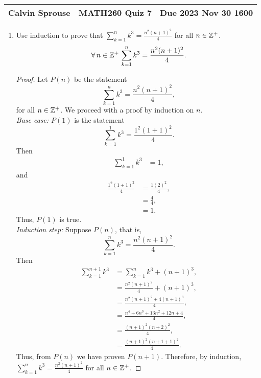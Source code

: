 \documentclass[a4paper, 12pt]{../../config/homework}
\begin{document}
\noindent
\begin{tabularx}{\textwidth}{>{\centering\arraybackslash}X>{\centering\arraybackslash}X>{\centering\arraybackslash}X}
Calvin Sprouse & MATH260 Quiz 7 & Due 2023 Nov 30 1600\\\hline
\end{tabularx}

\begin{enumerate}
\item Use induction to prove that $\sum_{k=1}^{n}{k^3} = \frac{n^2 (n+1)^2}{4}$ for all $n\in\mathbb{Z}^+$.
\[\forall\, n \in \mathbb{Z}^+ \, \sum_{k=1}^{n}{k^3} = \frac{n^2 (n+1)^2}{4}.\]
\begin{proof}
Let $P(n)$ be the statement
\[\sum_{k=1}^{n}{k^3} = \frac{n^2(n+1)^2}{4},\]
for all $n\in\mathbb{Z}^+$.
We proceed with a proof by induction on $n$.
\\\textit{Base case:} $P(1)$ is the statement
\[\sum_{k=1}^{1}k^3 = \frac{1^2(1+1)^2}{4}.\]
Then
\begin{align*}
\sum_{k=1}^{1}k^3 &= 1,
\end{align*}
and
\begin{align*}
\frac{1^2 (1+1)^2}{4} &= \frac{1 (2)^2}{4},
\\&= \frac{4}{4},
\\&= 1.
\end{align*}
Thus, $P(1)$ is true.
\\\textit{Induction step:} Suppose $P(n)$, that is,
\[\sum_{k=1}^{n}k^3 = \frac{n^2(n+1)^2}{4}.\]
Then
\begin{align*}
\sum_{k=1}^{n+1}k^3 &= \sum_{k=1}^{n}k^3 + (n+1)^3,\\
&= \frac{n^2(n+1)^2}{4} + (n+1)^3,\\
&= \frac{n^2(n+1)^2 + 4(n+1)^3}{4},\\
&= \frac{n^4+6 n^3+13 n^2+12 n+4}{4},\\
&= \frac{(n+1)^2(n+2)^2}{4},\\
&= \frac{(n+1)^2(n+1+1)^2}{4}.
\end{align*}
Thus, from $P(n)$ we have proven $P(n+1)$. Therefore, by induction,\\$\sum_{k=1}^{n}{k^3} = \frac{n^2 (n+1)^2}{4}$ for all $n\in\mathbb{Z}^+$.
\end{proof}


\end{enumerate}
\end{document}
